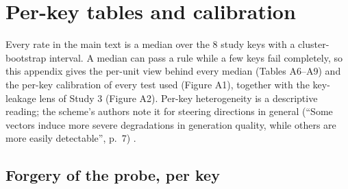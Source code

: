 \documentclass[11pt,letterpaper]{article}
\begin{document}
\hypertarget{per-key-tables-and-calibration}{%
\section{Per-key tables and calibration}\label{per-key-tables-and-calibration}}

Every rate in the main text is a median over the 8 study keys with a cluster-bootstrap interval. A median can pass a rule while a few keys fail completely, so this appendix gives the per-unit view behind every median (Tables A6--A9) and the per-key calibration of every test used (Figure A1), together with the key-leakage lens of Study 3 (Figure A2). Per-key heterogeneity is a descriptive reading; the scheme's authors note it for steering directions in general (``Some vectors induce more severe degradations in generation quality, while others are more easily detectable'', p.~7) \citep{ardoin2026selfrecognition}.

\hypertarget{forgery-of-the-probe-per-key}{%
\subsection{Forgery of the probe, per key}\label{forgery-of-the-probe-per-key}}
\end{document}

